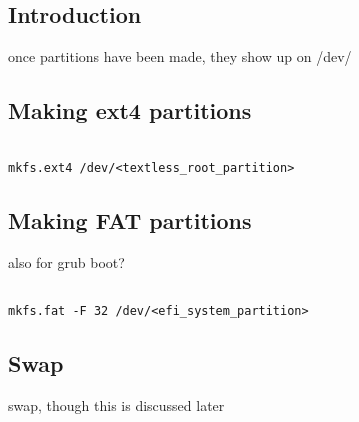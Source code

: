 
\subsection{Introduction}

once partitions have been made, they show up on /dev/


\subsection{Making ext4 partitions}

\begin{verbatim}

mkfs.ext4 /dev/<textless_root_partition>

\end{verbatim}

\subsection{Making FAT partitions}

also for grub boot?

\begin{verbatim}

mkfs.fat -F 32 /dev/<efi_system_partition>

\end{verbatim}

\subsection{Swap}
swap, though this is discussed later
